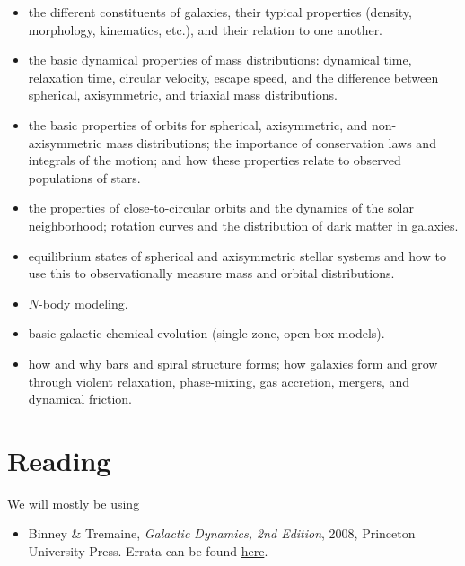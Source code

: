 \documentclass{article}
\begin{document}
\begin{itemize}

  \item the different constituents of galaxies, their typical
    properties (density, morphology, kinematics, etc.), and their
    relation to one another.

  \item the basic dynamical properties of mass distributions:
    dynamical time, relaxation time, circular velocity, escape speed,
    and the difference between spherical, axisymmetric, and triaxial
    mass distributions.

  \item the basic properties of orbits for spherical, axisymmetric,
    and non-axisymmetric mass distributions; the importance of
    conservation laws and integrals of the motion; and how these
    properties relate to observed populations of stars.

  \item the properties of close-to-circular orbits and the dynamics of
    the solar neighborhood; rotation curves and the distribution of
    dark matter in galaxies.

  \item equilibrium states of spherical and axisymmetric stellar
    systems and how to use this to observationally measure mass and
    orbital distributions.

  \item $N$-body modeling.

  \item basic galactic chemical evolution (single-zone, open-box
    models).

  \item how and why bars and spiral structure forms; how galaxies form
    and grow through violent relaxation, phase-mixing, gas accretion,
    mergers, and dynamical friction.

\end{itemize}

\section*{Reading}

We will mostly be using

\begin{itemize}

  \item Binney \& Tremaine, \emph{Galactic Dynamics, 2nd Edition},
    2008, Princeton University Press. Errata can be found
    \href{https://www-thphys.physics.ox.ac.uk/people/JamesBinney/web/index\_files/BT2errors.pdf}{here}.

\end{itemize}
\end{document}
